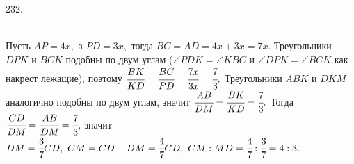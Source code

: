 232. \begin{figure}[ht!]
\end{figure}\\
Пусть $AP=4x,$ а $PD=3x,$ тогда $BC=AD=4x+3x=7x.$ Треугольники $DPK$ и $BCK$ подобны по двум углам ($\angle PDK=\angle KBC$ и $\angle DPK=\angle BCK$ как накрест лежащие), поэтому $\cfrac{BK}{KD}=\cfrac{BC}{PD}=\cfrac{7x}{3x}=\cfrac{7}{3}.$ Треугольники $ABK$ и $DKM$ аналогично подобны по двум углам, значит $\cfrac{AB}{DM}=\cfrac{BK}{KD}=\cfrac{7}{3}.$ Тогда $\cfrac{CD}{DM}=\cfrac{AB}{DM}=\cfrac{7}{3},$ значит $DM=\cfrac{3}{7}CD,\ CM=CD-DM=\cfrac{4}{7}CD,\ CM:MD=\cfrac{4}{7}:\cfrac{3}{7}=4:3.$\\

